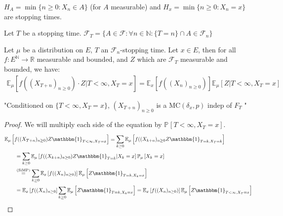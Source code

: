 \begin{ex}
	$H_{A}=\min\{n \geq 0: X_n \in  A\}$ (for $A$ measurable) and $H_x=\min\{n\geq 0: X_n = x\}$ are stopping times.
\end{ex}

\begin{defn}
	Let $T$ be a stopping time. $ \mathcal{F}_T=\{A \in \mathcal{F}: \forall n \in \mathbb{N}: \{T=n\}\cap A \in \mathcal{F}_n \}$
\end{defn}

\begin{theorem}
	Let $\mu $ be a distribution on $E$, $T$ an $ \mathcal{F}_n$-stopping time. Let $x \in E$,
	then for all $f:E^{\mathbb{N}} \to \mathbb{R}$ measurable and bounded, and $Z$ which are $ \mathcal{F}_T$ measurable and bounded, we have:
\begin{align}
	\mathbb{E}_{\mu } \left[ f((X_{T+n})_{n\geq 0}) \cdot Z | T<\infty, X_T=x \right] = \mathbb{E}_{x} \left[ f((X_n)_{n\geq 0}) \right]  \mathbb{E}_{\mu } \left[ Z | T<\infty, X_T=x \right] 
\end{align}

\end{theorem}
\noindent
"Conditioned on $\{T<\infty,X_T=x\}$, $(X_{T+n})_{n\geq 0}$ is a $ \textrm{MC}(\delta_x,p)$ indep of $F_T$ "
\begin{proof}
We will multiply each side of the equation by $\mathbb{P}_{} \left[ T < \infty, X_T =x \right]$.
\begin{align}
&	\mathbb{E}_{\mu } \left[ f((X_{T+n})_{n\geq 0})Z \mathbbm{1}_{T<\infty, X_T=x}  \right] =
		\sum_{k\geq 0}^{} \mathbb{E}_{\mu } \left[ f((X_{k+n})_{n\geq 0} Z \mathbbm{1}_{T=k, X_T=k}  \right] \\
&\qquad	= \sum_{k\geq 0}^{} \mathbb{E}_{\mu } \left[ f((X_{k+n})_{n\geq 0}) Z \mathbbm{1}_{T=k} | X_k = x \right] \mathbb{P}_{\mu } \left[ X_k = x  \right] \\ 
&\qquad	\stackrel{\text{(SiMP)}}{=} \sum_{k\geq 0}^{} \mathbb{E}_{x} \left[ f((X_{n})_{n\geq 0}) \right] \mathbb{E}_{\mu } \left[ Z \mathbbm{1}_{T=k, X_k = x}  \right] \\
&\qquad	= \mathbb{E}_{x} \left[ f((X_n)_{n\geq 0} \right] \sum_{k\geq 0}^{} \mathbb{E}_{\mu } \left[ Z \mathbbm{1}_{T=k, X_k=x}  \right]  
		= \mathbb{E}_{x} \left[ f((X_n)_{n\geq 0}) \right] \mathbb{E}_{\mu } \left[ Z \mathbbm{1}_{T<\infty, X_T=x}  \right] 
\end{align}
\end{proof}


